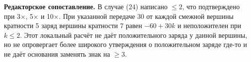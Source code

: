 \par\smallskip\noindent\leavevmode{}\label{GELFAND-P001456:case24-charge-inequality:editorial}{\footnotesize\textbf{Редакторское сопоставление.} В случае (24) написано $\le2$, что подтверждено при 3×, 5× и 10×. При указанной передаче 30 от каждой смежной вершины кратности 5 заряд вершины кратности 7 равен $-60+30k$ и неположителен при $k\le2$. Этот локальный расчёт не даёт положительного заряда у данной вершины, но не опровергает более широкого утверждения о положительном заряде где-то и не даёт основания заменять знак на $\ge3$.\par}\smallskip
